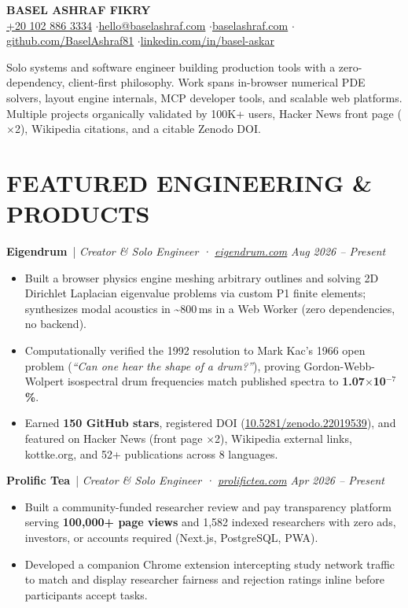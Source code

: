 \documentclass[10pt,letterpaper]{article}
\newcommand{\resumeItem}[1]{\item\small{#1}}
\newcommand{\resumeHeading}[3]{
  \vspace{1.5pt}
  {\textbf{#1}}~{\color{accent}|} \textit{#2} \hfill \textit{\small #3}
  \vspace{0pt}
}
\begin{document}
\begin{center}
    {\LARGE \textbf{BASEL ASHRAF FIKRY}}\\
    \vspace{2pt}
    \small \href{tel:+201028863334}{+20 102 886 3334} \enspace$\cdot$\enspace \href{mailto:hello@baselashraf.com}{hello@baselashraf.com} \enspace$\cdot$\enspace \href{https://baselashraf.com}{baselashraf.com} \enspace$\cdot$\enspace \href{https://github.com/BaselAshraf81}{github.com/BaselAshraf81} \enspace$\cdot$\enspace \href{https://linkedin.com/in/basel-askar}{linkedin.com/in/basel-askar}
\end{center}
\vspace{-7pt}

\small
Solo systems and software engineer building production tools with a zero-dependency, client-first philosophy. Work spans in-browser numerical PDE solvers, layout engine internals, MCP developer tools, and scalable web platforms. Multiple projects organically validated by 100K+ users, Hacker News front page ($\times$2), Wikipedia citations, and a citable Zenodo DOI.
\vspace{-2pt}

\section*{FEATURED ENGINEERING \& PRODUCTS}

\resumeHeading{Eigendrum}{Creator \& Solo Engineer · \href{https://eigendrum.com}{eigendrum.com}}{Aug 2026 -- Present}
\begin{itemize}
  \resumeItem{Built a browser physics engine meshing arbitrary outlines and solving 2D Dirichlet Laplacian eigenvalue problems via custom P1 finite elements; synthesizes modal acoustics in \textasciitilde800\,ms in a Web Worker (zero dependencies, no backend).}
  \resumeItem{Computationally verified the 1992 resolution to Mark Kac's 1966 open problem (\textit{``Can one hear the shape of a drum?''}), proving Gordon-Webb-Wolpert isospectral drum frequencies match published spectra to \textbf{1.07\(\times\)10\(^{-7}\)\%}.}
  \resumeItem{Earned \textbf{150 GitHub stars}, registered DOI (\href{https://doi.org/10.5281/zenodo.22019539}{10.5281/zenodo.22019539}), and featured on Hacker News (front page $\times$2), Wikipedia external links, kottke.org, and 52+ publications across 8 languages.}
\end{itemize}

\resumeHeading{Prolific Tea}{Creator \& Solo Engineer · \href{https://prolifictea.com}{prolifictea.com}}{Apr 2026 -- Present}
\begin{itemize}
  \resumeItem{Built a community-funded researcher review and pay transparency platform serving \textbf{100,000+ page views} and 1,582 indexed researchers with zero ads, investors, or accounts required (Next.js, PostgreSQL, PWA).}
  \resumeItem{Developed a companion Chrome extension intercepting study network traffic to match and display researcher fairness and rejection ratings inline before participants accept tasks.}
\end{itemize}
\end{document}
